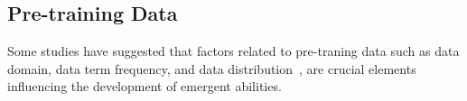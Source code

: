 \subsection{Pre-training Data}
Some studies have suggested that factors related to pre-traning data such as data domain, data term frequency, and data distribution~\citep{Chan2022DataDP, Razeghi2022ImpactOP}, are crucial elements influencing the development of emergent abilities.
